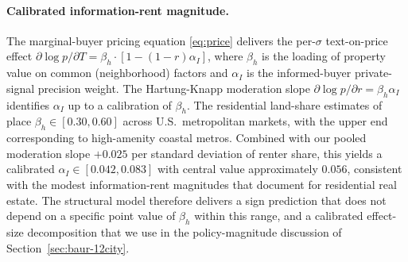 \paragraph{Calibrated information-rent magnitude.} The marginal-buyer
pricing equation \eqref{eq:price} delivers the per-$\sigma$
text-on-price effect $\partial \log p / \partial T = \beta_h \cdot
[1 - (1-r) \alpha_I]$, where $\beta_h$ is the loading of property
value on common (neighborhood) factors and $\alpha_I$ is the
informed-buyer private-signal precision weight.  The Hartung-Knapp
moderation slope $\partial \log p / \partial r = \beta_h \alpha_I$
identifies $\alpha_I$ up to a calibration of $\beta_h$.  The
residential land-share estimates of \citet{davis2007price} place
$\beta_h \in [0.30, 0.60]$ across U.S.\ metropolitan markets, with
the upper end corresponding to high-amenity coastal metros.
Combined with our pooled moderation slope $+0.025$ per standard
deviation of renter share, this yields a calibrated
$\alpha_I \in [0.042, 0.083]$ with central value approximately
$0.056$, consistent with the modest information-rent magnitudes that
\citeauthor{kurlat2015testing} document for residential real estate.
The structural model therefore delivers a sign prediction that does
not depend on a specific point value of $\beta_h$ within this range,
and a calibrated effect-size decomposition that we use in the
policy-magnitude discussion of Section~\ref{sec:baur-12city}.

